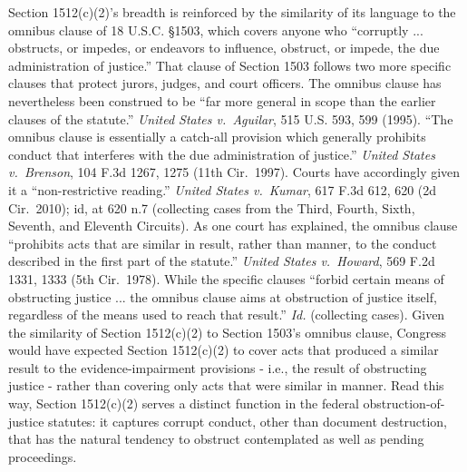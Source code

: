 Section 1512(c)(2)’s breadth is reinforced by the similarity of its language to the omnibus clause of 18 U.S.C. \S 1503, which covers anyone who “corruptly ... obstructs, or impedes, or endeavors to influence, obstruct, or impede, the due administration of justice.” That clause of Section 1503 follows two more specific clauses that protect jurors, judges, and court officers.
The omnibus clause has nevertheless been construed to be “far more general in scope than the earlier clauses of the statute.”
\textit{United States v.\ Aguilar}, 515 U.S. 593, 599 (1995).
“The omnibus clause is essentially a catch-all provision which generally prohibits conduct that interferes with the due administration of justice.”
\textit{United States v.\ Brenson}, 104 F.3d 1267, 1275 (11th Cir.~1997).
Courts have accordingly given it a “non-restrictive reading.”
\textit{United States v.\ Kumar}, 617 F.3d 612, 620 (2d Cir.~2010); id, at 620 n.7 (collecting cases from the Third, Fourth, Sixth, Seventh, and Eleventh Circuits).
As one court has explained, the omnibus clause “prohibits acts that are similar in result, rather than manner, to the conduct described in the first part of the statute.”
\textit{United States v.\ Howard}, 569 F.2d 1331, 1333 (5th Cir.~1978).
While the specific clauses “forbid certain means of obstructing justice ... the omnibus clause aims at obstruction of justice itself, regardless of the means used to reach that result.”
\textit{Id.} (collecting cases).
Given the similarity of Section 1512(c)(2) to Section 1503’s omnibus clause, Congress would have expected Section 1512(c)(2) to cover acts that produced a similar result to the evidence-impairment provisions - i.e., the result of obstructing justice - rather than covering only acts that were similar in manner.
Read this way, Section 1512(c)(2) serves a distinct function in the federal obstruction-of-justice statutes: it captures corrupt conduct, other than document destruction, that has the natural tendency to obstruct contemplated as well as pending proceedings.

